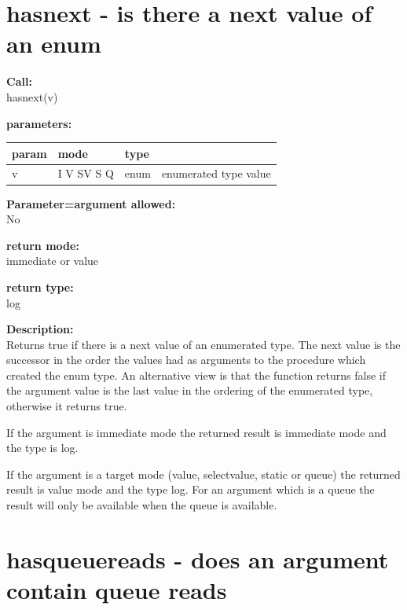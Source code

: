     \section{hasnext - is there a next value of an enum}\label{sec:ifhasnext}
        
        {\bf Call:} \\
        hasnext(v)
        
        {\bf parameters:} \\
        \begin{tabular}{| l | l | l | l |}
        \hline
        param  & mode & type & \\
        \hline \hline
        v & I V SV S Q & enum & enumerated type value \\ \hline
        \end{tabular}
        
        {\bf Parameter=argument allowed:} \\
        No
        
        {\bf return mode:} \\
        immediate or value

        {\bf return type:} \\
        log
        
        {\bf Description:} \\
        Returns true if there is a next value of an enumerated type. The next
        value is the successor in the order the values had as arguments to
        the procedure which created the enum type. An alternative view is
        that the function returns false if the argument value is the last
        value in the ordering of the enumerated type, otherwise it returns true.
        
        If the argument is immediate mode the returned result is immediate
        mode and the type is log.
        
        If the argument is a target mode (value, selectvalue, static or queue)
        the returned result is value mode and the type log. For an argument
        which is a queue the result will only be available when the queue is
        available.
 


    \section{hasqueuereads - does an argument contain queue reads}\label{sec:ifhasqueuereads}
        
